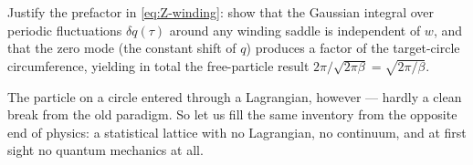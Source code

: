 \begin{exercise}[medium]
\label{exr:fluctuation}
Justify the prefactor in \eqref{eq:Z-winding}: show that the Gaussian integral
over periodic fluctuations $\delta q(\tau)$ around any winding saddle is
independent of $w$, and that the zero mode (the constant shift of $q$) produces
a factor of the target-circle circumference, yielding in total the free-particle
result $2\pi/\sqrt{2\pi\beta} = \sqrt{2\pi/\beta}$.
\end{exercise}

\medskip
The particle on a circle entered through a Lagrangian, however --- hardly a
clean break from the old paradigm. So let us fill the same inventory from the
opposite end of physics: a statistical lattice with no Lagrangian, no continuum,
and at first sight no quantum mechanics at all.

